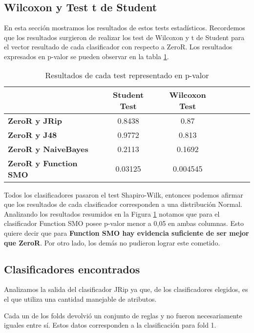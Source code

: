 \subsection{Wilcoxon y Test t de Student}

En esta sección mostramos los resultados de estos tests estadísticos. Recordemos que los resultados surgieron de realizar los test de Wilcoxon y t de Student para el vector resultado de cada clasificador con respecto a ZeroR. Los resultados expresados en p-valor se pueden observar en la tabla \ref{res_tests_wilcoxon_student}.

\begin{table}[H]
\centering
\begin{tabular}{|l|c|c|c|c|c|c|}
\hline
\textbf{}  & \textbf{Student Test} & \textbf{Wilcoxon Test} \\ \hline
\textbf{ZeroR y JRip}  & 0.8438 & 0.87 \\ \hline
\textbf{ZeroR y J48}  & 0.9772 & 0.813 \\ \hline
\textbf{ZeroR y NaiveBayes}  & 0.2113 & 0.1692 \\ \hline
\textbf{ZeroR y Function SMO}  & 0.03125 & 0.004545 \\ \hline
\end{tabular}
\caption{Resultados de cada test representado en p-valor}
\label{res_tests_wilcoxon_student}
\end{table}

Todos los clasificadores pasaron el test Shapiro-Wilk, entonces podemos afirmar que los resultados de cada clasificador corresponden a una distribución Normal. Analizando los resultados resumidos en la Figura \ref{res_tests_wilcoxon_student} notamos que para el clasificador Function SMO posee p-valor menor a 0,05 en ambas columnas. Esto quiere decir que para \textbf{Function SMO hay evidencia suficiente de ser mejor que ZeroR}. Por otro lado, los demás no pudieron lograr este cometido. 

\subsection{Clasificadores encontrados}

Analizamos la salida del clasificador JRip ya que, de los clasificadores elegidos, es el que utiliza una cantidad manejable de atributos. 

Cada un de los folds devolvió un conjunto de reglas y no fueron necesariamente iguales entre sí. Estos datos corresponden a la clasificación para fold 1.

